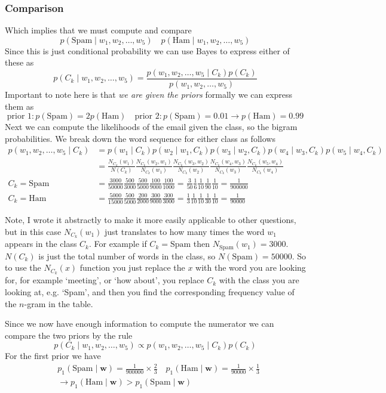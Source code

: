 \documentclass[12pt]{article}
\begin{document}
\subsubsection*{Comparison}
Which implies that we must compute and compare
\[
    p(\text{Spam}\mid w_1, w_2, \ldots, w_5) \quad p(\text{Ham}\mid w_1, w_2, \ldots, w_5)
\]
Since this is just conditional probability we can use Bayes to express either of these as 
\[
    p(C_k\mid w_1, w_2, \ldots, w_5) = \frac{p(w_1, w_2, \ldots, w_5\mid C_k)p(C_k)}{p(w_1, w_2, \ldots, w_5)}
\]
Important to note here is that \textit{we are given the priors} formally we can express them as 
\[
    \text{prior 1}: p(\text{Spam}) = 2p(\text{Ham}) \quad \text{prior 2}: p(\text{Spam}) = 0.01 \rightarrow p(\text{Ham}) = 0.99    
\]
Next we can compute the likelihoods of the email given the class, so the bigram probabilities. We break down the word sequence for either class as follows 
\begin{align*}
    p(w_1, w_2, \ldots, w_5\mid C_k) &= p(w_1\mid C_k)p(w_2\mid w_1, C_k)p(w_3\mid w_2, C_k)p(w_4\mid w_3, C_k)p(w_5\mid w_4, C_k) \\
    &= \frac{N_{C_k}(w_1)}{N(C_k)}\frac{N_{C_k}(w_2, w_1)}{N_{C_k}(w_1)}\frac{N_{C_k}(w_3, w_2)}{N_{C_k}(w_2)}\frac{N_{C_k}(w_4, w_3)}{N_{C_k}(w_3)}\frac{N_{C_k}(w_5, w_4)}{N_{C_k}(w_4)} \\ 
    C_k = \text{Spam} &= \frac{3000}{50000}\frac{500}{3000}\frac{500}{5000}\frac{100}{9000}\frac{100}{1000} = \frac{3}{50}\frac{1}{6} \frac{1}{10}\frac{1}{90}\frac{1}{10} = \frac{1}{900000} \\
    C_k = \text{Ham} &= \frac{5000}{15000}\frac{500}{5000}\frac{200}{2000}\frac{300}{9000}\frac{300}{3000} = \frac{1}{3}\frac{1}{10}\frac{1}{10}\frac{1}{30}\frac{1}{10} = \frac{1}{90000}
\end{align*}

Note, I wrote it abstractly to make it more easily applicable to other questions, but in this case $N_{C_k}(w_1)$ just translates to how many times the word $w_1$ appears in the class $C_k$. For example if $C_k = \text{Spam}$ then $N_{\text{Spam}}(w_1) = 3000$. $N(C_k)$ is just the total number of words in the class, so $N(\text{Spam}) = 50000$. So to use the $N_{C_k}(x)$ function you just replace the $x$ with the word you are looking for, for example `meeting', or `how about', you replace $C_k$ with the class you are looking at, e.g. `Spam', and then you find the corresponding frequency value of the $n$-gram in the table. 

\smallskip
Since we now have enough information to compute the numerator we can compare the two priors by the rule 
\[
    p(C_k\mid w_1, w_2, \ldots, w_5) \propto p(w_1, w_2, \ldots, w_5\mid C_k)p(C_k)
\]
For the first prior we have 
\begin{align*}
    &p_1(\text{Spam}\mid \mathbf w) = \frac{1}{900000}\times \frac{2}{3} \quad p_1(\text{Ham}\mid \mathbf w) = \frac{1}{90000}\times \frac{1}{3} \\ 
    &\rightarrow p_1(\text{Ham} \mid \mathbf w) > p_1(\text{Spam}\mid \mathbf w)
\end{align*}
\end{document}

